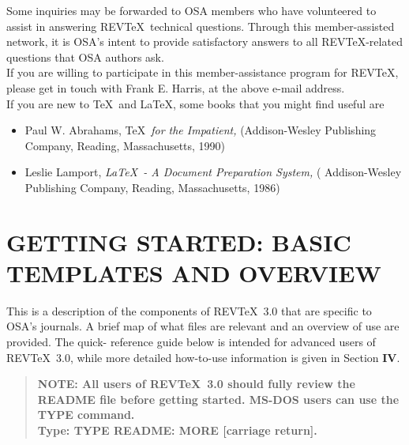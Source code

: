     Some inquiries may be forwarded to OSA members who have
volunteered to assist in answering REV\TeX\ technical questions.
Through this member-assisted network, it is OSA's intent to
provide satisfactory answers to all REV\TeX-related questions that
OSA authors ask.   \\

     If you are willing to participate in this member-assistance
program for REV\TeX, please get in touch with Frank E. Harris,
at the above e-mail address. \\

     If you are new to \TeX\ and \LaTeX, some books that you might
find useful are
\begin{itemize}
\item     Paul W. Abrahams, {\TeX\  \it  for the Impatient,}
          (Addison-Wesley Publishing Company, Reading,
          Massachusetts, 1990)

\item     Leslie Lamport, {\it \LaTeX\ - A Document Preparation System,}
          ( Addison-Wesley Publishing
          Company, Reading, Massachusetts, 1986)
\end{itemize}



\section{ GETTING STARTED:  BASIC TEMPLATES AND OVERVIEW}

     This is a description of the components of REV\TeX\ 3.0 that
are specific to OSA's journals.  A brief map of what files are
relevant and an overview of use are provided.  The quick-
reference guide below is intended for advanced users of REV\TeX\
3.0, while more detailed how-to-use information is given in
Section {\bf IV}.
\begin{quote}
        {\bf   NOTE:  All users of REV\TeX\ 3.0
should fully review the README  file before getting started. MS-DOS
users can use the TYPE command.\\
               Type: TYPE README: MORE [carriage return]. } \\
\end{quote}

